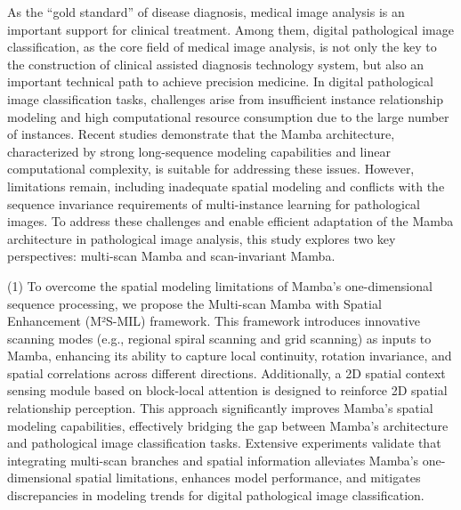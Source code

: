 \begin{eabstract}	%
As the ``gold standard'' of disease diagnosis, medical image analysis is an important support for clinical treatment. Among them, digital pathological image classification, as the core field of medical image analysis, is not only the key to the construction of clinical assisted diagnosis technology system, but also an important technical path to achieve precision medicine.
In digital pathological image classification tasks, challenges arise from insufficient instance relationship modeling and high computational resource consumption due to the large number of instances. Recent studies demonstrate that the Mamba architecture, characterized by strong long-sequence modeling capabilities and linear computational complexity, is suitable for addressing these issues. However, limitations remain, including inadequate spatial modeling and conflicts with the sequence invariance requirements of multi-instance learning for pathological images.
To address these challenges and enable efficient adaptation of the Mamba architecture in pathological image analysis, this study explores two key perspectives: multi-scan Mamba and scan-invariant Mamba.

(1) To overcome the spatial modeling limitations of Mamba's one-dimensional sequence processing, we propose the Multi-scan Mamba with Spatial Enhancement (M²S-MIL) framework. This framework introduces innovative scanning modes (e.g., regional spiral scanning and grid scanning) as inputs to Mamba, enhancing its ability to capture local continuity, rotation invariance, and spatial correlations across different directions. Additionally, a 2D spatial context sensing module based on block-local attention is designed to reinforce 2D spatial relationship perception. This approach significantly improves Mamba's spatial modeling capabilities, effectively bridging the gap between Mamba's architecture and pathological image classification tasks. Extensive experiments validate that integrating multi-scan branches and spatial information alleviates Mamba's one-dimensional spatial limitations, enhances model performance, and mitigates discrepancies in modeling trends for digital pathological image classification.


\end{eabstract}
